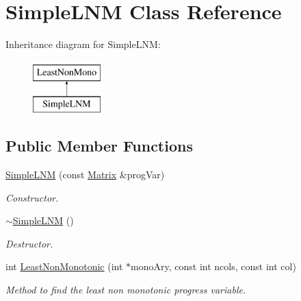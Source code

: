 \hypertarget{classSimpleLNM}{
\section{SimpleLNM Class Reference}
\label{d8/dfe/classSimpleLNM}
}
Inheritance diagram for SimpleLNM:\begin{figure}[H]
\begin{center}
\leavevmode
\includegraphics[height=2cm]{d8/dfe/classSimpleLNM}
\end{center}
\end{figure}
\subsection*{Public Member Functions}
\begin{DoxyCompactItemize}
\item 
\hyperlink{classSimpleLNM_a45bd676f6bb504baf1b46ddcbf2f8fb8}{SimpleLNM} (const \hyperlink{classMatrix}{Matrix} \&progVar)
\begin{DoxyCompactList}\small\item\em Constructor. \item\end{DoxyCompactList}\item 
\hypertarget{classSimpleLNM_a89cbe5270c4846ebba8ab1660149112f}{
\hyperlink{classSimpleLNM_a89cbe5270c4846ebba8ab1660149112f}{$\sim$SimpleLNM} ()}
\label{d8/dfe/classSimpleLNM_a89cbe5270c4846ebba8ab1660149112f}

\begin{DoxyCompactList}\small\item\em Destructor. \item\end{DoxyCompactList}\item 
int \hyperlink{classSimpleLNM_a9d296839ca84467c0f6241b1393bd6d5}{LeastNonMonotonic} (int $\ast$monoAry, const int ncols, const int col)
\begin{DoxyCompactList}\small\item\em Method to find the least non monotonic progress variable. \item\end{DoxyCompactList}\end{DoxyCompactItemize}


